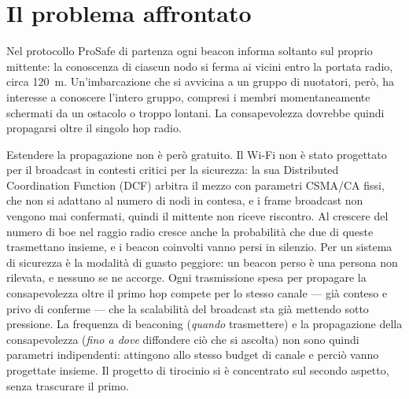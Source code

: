 \section{Il problema affrontato}
\label{sec:intro-problema}
Nel protocollo ProSafe di partenza ogni beacon informa soltanto sul proprio
mittente: la conoscenza di ciascun nodo si ferma ai vicini entro la portata
radio, circa \SI{120}{\metre}. Un'imbarcazione che si avvicina a un gruppo di
nuotatori, per\`o, ha interesse a conoscere l'intero gruppo, compresi i
membri momentaneamente schermati da un ostacolo o troppo lontani. 
La consapevolezza dovrebbe quindi propagarsi oltre il singolo hop radio.

Estendere la propagazione non \`e per\`o gratuito. Il Wi-Fi non \`e stato
progettato per il broadcast in contesti critici per la sicurezza: la sua
Distributed Coordination Function (DCF) arbitra il mezzo con parametri
CSMA/CA fissi, che non si adattano al numero di nodi in contesa, e i frame
broadcast non vengono mai confermati, quindi il mittente non riceve riscontro. 
Al crescere del numero di boe nel raggio radio cresce anche la probabilit\`a che due di queste trasmettano insieme,
e i beacon coinvolti vanno persi in silenzio. Per un sistema di sicurezza \`e
la modalit\`a di guasto peggiore: un beacon perso \`e una persona non
rilevata, e nessuno se ne accorge. Ogni trasmissione spesa per propagare la
consapevolezza oltre il primo hop compete per lo stesso canale --- gi\`a
conteso e privo di conferme --- che la scalabilit\`a del broadcast sta gi\`a
mettendo sotto pressione. La frequenza di beaconing (\emph{quando}
trasmettere) e la propagazione della consapevolezza (\emph{fino a dove}
diffondere ci\`o che si ascolta) non sono quindi parametri indipendenti:
attingono allo stesso budget di canale e perci\`o vanno progettate insieme. 
Il progetto di tirocinio si \`e concentrato sul secondo aspetto, senza trascurare il primo.

